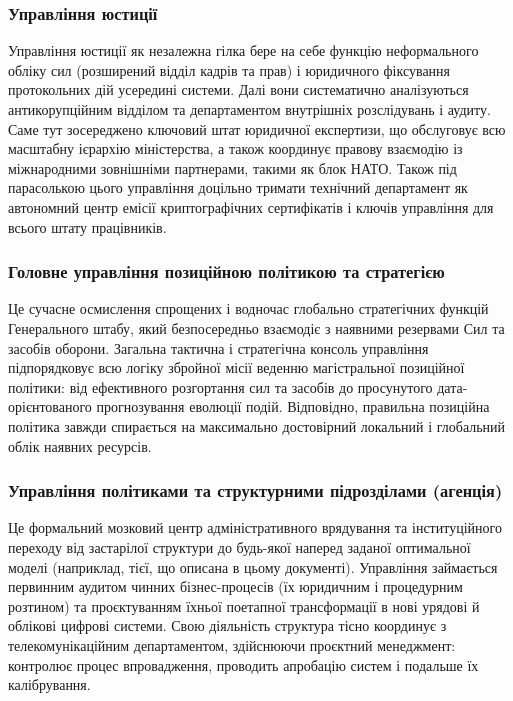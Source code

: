 \subsubsection{Управління юстиції}

Управління юстиції як незалежна гілка бере на себе функцію неформального обліку сил (розширений відділ кадрів та прав) і юридичного фіксування протокольних дій усередині системи. Далі вони систематично аналізуються антикорупційним відділом та департаментом внутрішніх розслідувань і аудиту. Саме тут зосереджено ключовий штат юридичної експертизи, що обслуговує всю масштабну ієрархію міністерства, а також координує правову взаємодію із міжнародними зовнішніми партнерами, такими як блок НАТО. Також під парасолькою цього управління доцільно тримати технічний департамент як автономний центр емісії криптографічних сертифікатів і ключів управління для всього штату працівників.

\subsubsection{Головне управління позиційною політикою та стратегією}

Це сучасне осмислення спрощених і водночас глобально стратегічних функцій Генерального штабу, який безпосередньо взаємодіє з наявними резервами Сил та засобів оборони. Загальна тактична і стратегічна консоль управління підпорядковує всю логіку збройної місії веденню магістральної позиційної політики: від ефективного розгортання сил та засобів до просунутого дата-орієнтованого прогнозування еволюції подій. Відповідно, правильна позиційна політика завжди спирається на максимально достовірний локальний і глобальний облік наявних ресурсів.

\subsubsection{Управління політиками та структурними підрозділами (агенція)}

Це формальний мозковий центр адміністративного врядування та інституційного переходу від застарілої структури до будь-якої наперед заданої оптимальної моделі (наприклад, тієї, що описана в цьому документі). Управління займається первинним аудитом чинних бізнес-процесів (їх юридичним і процедурним розтином) та проєктуванням їхньої поетапної трансформації в нові урядові й облікові цифрові системи. Свою діяльність структура тісно координує з телекомунікаційним департаментом, здійснюючи проєктний менеджмент: контролює процес впровадження, проводить апробацію систем і подальше їх калібрування.

